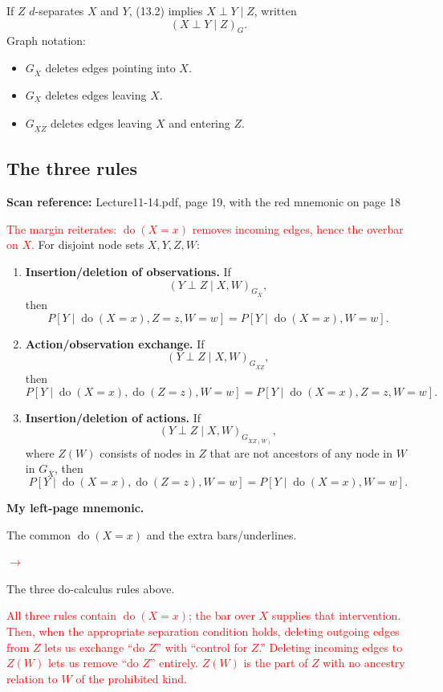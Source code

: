 \documentclass[11pt,a4paper]{article}
\newcommand{\sourcepages}[1]{\par{\small\sffamily\color{muted}\textbf{Scan reference:} #1\par}\nobreak\smallskip\nopagebreak[4]}
\newcommand{\inkred}[1]{\textcolor{red}{#1}}
\newcommand{\notearrow}[3]{%
\par\Needspace{6\baselineskip}\smallskip
\noindent\begin{minipage}[c]{0.43\linewidth}\raggedright\color{#1}#2\end{minipage}%
\hfill\textcolor{#1}{\(\longrightarrow\)}\hfill%
\begin{minipage}[c]{0.43\linewidth}\raggedright#3\end{minipage}\par\smallskip}
\begin{document}
If $Z$ $d$-separates $X$ and $Y$, (13.2) implies $X\perp Y\mid Z$, written
\[
 (X\perp Y\mid Z)_G.
\]
Graph notation:
\begin{itemize}
 \item $G_{\overline X}$ deletes edges pointing into $X$.
 \item $G_{\underline X}$ deletes edges leaving $X$.
 \item $G_{\underline X\overline Z}$ deletes edges leaving $X$ and entering $Z$.
\end{itemize}

\subsection{The three rules}
\sourcepages{Lecture11-14.pdf, page 19, with the red mnemonic on page 18}
\inkred{The margin reiterates: $\operatorname{do}(X=x)$ removes incoming edges, hence the overbar on $X$.} For disjoint node sets $X,Y,Z,W$:
\begin{enumerate}
 \item \textbf{Insertion/deletion of observations.} If
 \[(Y\perp Z\mid X,W)_{G_{\overline X}},\]
 then
 \[
 P[Y\mid\operatorname{do}(X=x),Z=z,W=w]
 =P[Y\mid\operatorname{do}(X=x),W=w].
 \]
 \item \textbf{Action/observation exchange.} If
 \[(Y\perp Z\mid X,W)_{G_{\overline X\underline Z}},\]
 then
 \[
 P[Y\mid\operatorname{do}(X=x),\operatorname{do}(Z=z),W=w]
 =P[Y\mid\operatorname{do}(X=x),Z=z,W=w].
 \]
 \item \textbf{Insertion/deletion of actions.} If
 \[(Y\perp Z\mid X,W)_{G_{\overline X\overline{Z(W)}}},\]
 where $Z(W)$ consists of nodes in $Z$ that are not ancestors of any node in $W$ in $G_{\overline X}$, then
 \[
 P[Y\mid\operatorname{do}(X=x),\operatorname{do}(Z=z),W=w]
 =P[Y\mid\operatorname{do}(X=x),W=w].
 \]
\end{enumerate}
\par{}\noindent\textbf{My left-page mnemonic.}\par\smallskip
\notearrow{red}{The common $\operatorname{do}(X=x)$ and the extra bars/underlines.}{The three do-calculus rules above.}
\inkred{All three rules contain $\operatorname{do}(X=x)$; the bar over $X$ supplies that intervention. Then, when the appropriate separation condition holds, deleting outgoing edges from $Z$ lets us exchange ``do $Z$'' with ``control for $Z$.'' Deleting incoming edges to $Z(W)$ lets us remove ``do $Z$'' entirely. $Z(W)$ is the part of $Z$ with no ancestry relation to $W$ of the prohibited kind.}
\end{document}

